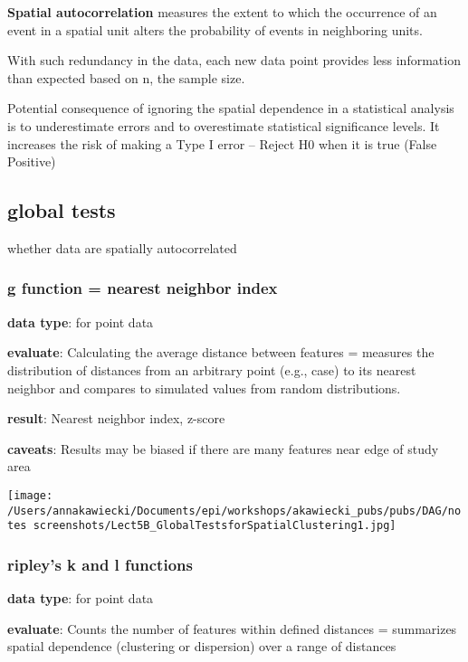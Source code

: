 \documentclass[
]{article}
\begin{document}
\textbf{Spatial autocorrelation} measures the extent to which the
occurrence of an event in a spatial unit alters the probability of
events in neighboring units.

With such redundancy in the data, each new data point provides less
information than expected based on n, the sample size.

Potential consequence of ignoring the spatial dependence in a
statistical analysis is to underestimate errors and to overestimate
statistical significance levels. It increases the risk of making a Type
I error -- Reject H0 when it is true (False Positive)

\hypertarget{global-tests}{%
\subsection{global tests}\label{global-tests}}

whether data are spatially autocorrelated

\hypertarget{g-function-nearest-neighbor-index}{%
\subsubsection{g function = nearest neighbor
index}\label{g-function-nearest-neighbor-index}}

\textbf{data type}: for point data

\textbf{evaluate}: Calculating the average distance between features =
measures the distribution of distances from an arbitrary point (e.g.,
case) to its nearest neighbor and compares to simulated values from
random distributions.

\textbf{result}: Nearest neighbor index, z-score

\textbf{caveats}: Results may be biased if there are many features near
edge of study area

\texttt{[image: /Users/annakawiecki/Documents/epi/workshops/akawiecki\_pubs/pubs/DAG/notes screenshots/Lect5B\_GlobalTestsforSpatialClustering1.jpg]}

\hypertarget{ripleys-k-and-l-functions}{%
\subsubsection{ripley's k and l
functions}\label{ripleys-k-and-l-functions}}

\textbf{data type}: for point data

\textbf{evaluate}: Counts the number of features within defined
distances = summarizes spatial dependence (clustering or dispersion)
over a range of distances
\end{document}
